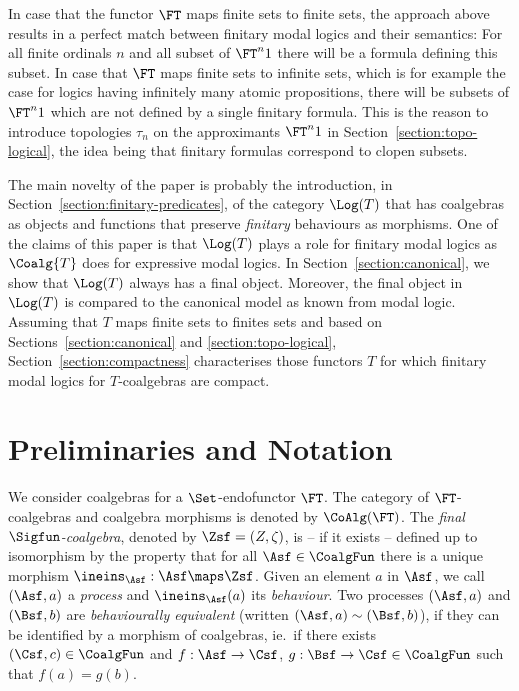 \documentclass{entcs}
\begin{document}
In case that the functor $\FT$ maps finite sets to finite sets, the
approach above results in a perfect match between finitary modal
logics and their semantics: For all finite ordinals $n$ and all subset
of $\FT^n 1$ there will be a formula defining this subset. In case
that $\FT$ maps finite sets to infinite sets, which is for example the
case for logics having infinitely many atomic propositions, there will
be subsets of $\FT^n 1$ which are not defined by a single finitary
formula.  This is the reason to introduce topologies $\tau_n$ on the
approximants $\FT^n 1$ in Section~\ref{section:topo-logical}, the idea
being that finitary formulas correspond to clopen subsets.


The main novelty of the paper is probably the introduction, in
Section~\ref{section:finitary-predicates}, of the category $\Log(T)$
that has coalgebras as objects and functions that preserve
\emph{finitary} behaviours as morphisms. One of the claims of this
paper is that $\Log(T)$ plays a role for finitary modal logics as
$\Coalg{T}$ does for expressive modal logics. In
Section~\ref{section:canonical}, we show that $\Log(T)$ always has a
final object. Moreover, the final object in $\Log(T)$ is compared to
the canonical model as known from modal logic.  Assuming that $T$ maps
finite sets to finites sets and based on
Sections~\ref{section:canonical} and \ref{section:topo-logical},
Section~\ref{section:compactness} characterises those functors
$T$ for which finitary modal logics for $T$-coalgebras are compact.






\section{Preliminaries and Notation}\label{section:preliminaries}


We consider coalgebras for a $\Set$-endofunctor $\FT$. The category of
$\FT$-coalgebras and coalgebra morphisms is denoted by $\CoAlg(\FT)$.
%
The \emph{final $\Sigfun$-coalgebra}, denoted by $\Zsf=(Z,\zeta)$, is
-- if it exists -- defined up to isomorphism by the property that for
all $\Asf\in\CoalgFun$ there is a unique morphism
$\ineins_\Asf:\Asf\maps\Zsf$.  Given an element $a$ in $\Asf$, we call
$(\Asf,a)$ a \emph{process} and $\ineins_\Asf(a)$ its
\emph{behaviour}. Two processes $(\Asf,a)$ and $(\Bsf,b)$ are
\emph{behaviourally equivalent} (written $(\Asf,a)\sim(\Bsf,b)$), if
they can be identified by a morphism of coalgebras, ie.\ if there
exists $(\Csf, c) \in \CoalgFun$ and $f: \Asf \to \Csf$, $g:\Bsf \to
\Csf \in \CoalgFun$ such that $f(a) = g(b)$.
\end{document}
